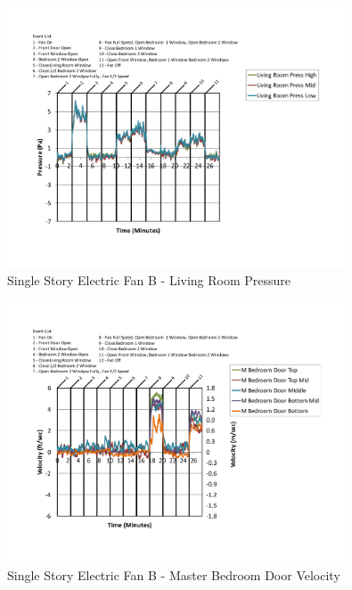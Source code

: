 \documentclass{article}
\begin{document}
\begin{appendices}
	\begin{figure}[H]
		\centering
		\includegraphics[height=3.05in,trim=0.67in 1.1in 0.67in 0.8in,clip=true]{0_Images/Results_Charts/ColdFlow/Single_Story/Electric/B/Living_Room_Pressure.pdf}
		\caption{Single Story Electric Fan B - Living Room Pressure}
	\end{figure}
 

	\begin{figure}[H]
		\centering
		\includegraphics[height=3.05in,trim=0.67in 1.1in 0.67in 0.8in,clip=true]{0_Images/Results_Charts/ColdFlow/Single_Story/Electric/B/Master_Bedroom_Door_Velocity.pdf}
		\caption{Single Story Electric Fan B - Master Bedroom Door Velocity}
	\end{figure}
 
	\clearpage


\end{appendices}
\end{document}
